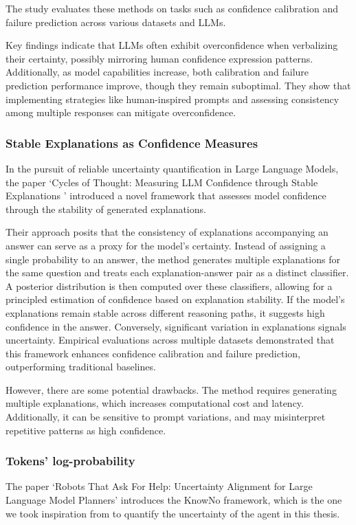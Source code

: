 The study evaluates these methods on tasks such as confidence calibration and
failure prediction across various datasets and LLMs.

Key findings indicate that LLMs often exhibit overconfidence when verbalizing
their certainty, possibly mirroring human confidence expression patterns.
Additionally, as model capabilities increase, both calibration and failure
prediction performance improve, though they remain suboptimal. They show that
implementing strategies like human-inspired prompts and assessing consistency
among multiple responses can mitigate overconfidence.

\subsubsection{Stable Explanations as Confidence Measures}
In the pursuit of reliable uncertainty quantification in Large Language Models, the
paper `Cycles of Thought: Measuring LLM Confidence through Stable Explanations '
\cite{becker2024cyclesthoughtmeasuringllm} introduced a novel framework that assesses
model confidence through the stability of generated explanations.

Their approach posits that the consistency of explanations accompanying an answer
can serve as a proxy for the model's certainty. Instead of assigning a single
probability to an answer, the method generates multiple explanations for the same
question and treats each explanation-answer pair as a distinct classifier. A
posterior distribution is then computed over these classifiers, allowing for a principled
estimation of confidence based on explanation stability. If the model's
explanations remain stable across different reasoning paths, it suggests high confidence
in the answer. Conversely, significant variation in explanations signals uncertainty.
Empirical evaluations across multiple datasets demonstrated that this framework
enhances confidence calibration and failure prediction, outperforming traditional
baselines.

However, there are some potential drawbacks. The method requires generating multiple
explanations, which increases computational cost and latency. Additionally, it
can be sensitive to prompt variations, and may misinterpret repetitive patterns as
high confidence.

\subsubsection{Tokens' log-probability}
\label{ssub:tokens_log_probability} The paper `Robots That Ask For Help: Uncertainty
Alignment for Large Language Model Planners'
\cite{ren2023robotsaskhelpuncertainty} introduces the KnowNo framework, which is
the one we took inspiration from to quantify the uncertainty of the agent in this
thesis.

